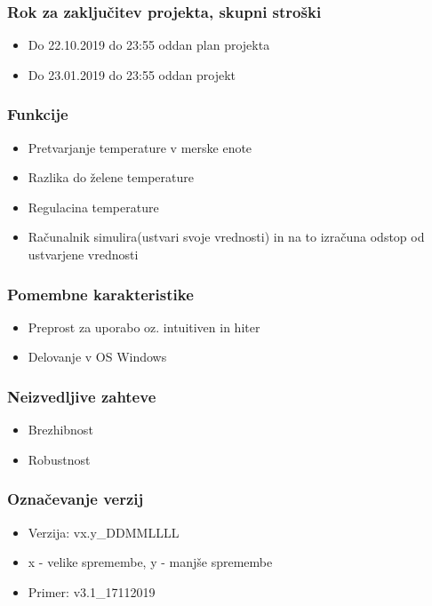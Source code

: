 \documentclass[a4paper,12pt]{article}
\begin{document}
		\subsubsection{Rok za zaključitev projekta, skupni stroški}

				\begin{itemize}
					\item Do 22.10.2019 do 23:55 oddan plan projekta 
					\item Do 23.01.2019 do 23:55 oddan projekt
				\end{itemize}

		\subsubsection{Funkcije}

				\begin{itemize}
					\item Pretvarjanje temperature v merske enote
					\item Razlika do želene temperature
					\item Regulacina temperature
					\item Računalnik simulira(ustvari svoje vrednosti) in na to	izračuna odstop od ustvarjene vrednosti
				\end{itemize}

		\subsubsection{Pomembne karakteristike}

				\begin{itemize}
					\item Preprost za uporabo oz. intuitiven in hiter
					\item Delovanje v OS Windows
				\end{itemize}

		\subsubsection{Neizvedljive zahteve}

				\begin{itemize}
					\item Brezhibnost
					\item Robustnost
				\end{itemize}

		\subsubsection{Označevanje verzij}

				\begin{itemize}
					\item Verzija: vx.y\_DDMMLLLL
					\item x - velike spremembe, y - manjše spremembe
					\item Primer: v3.1\_17112019
				\end{itemize}
\end{document}
